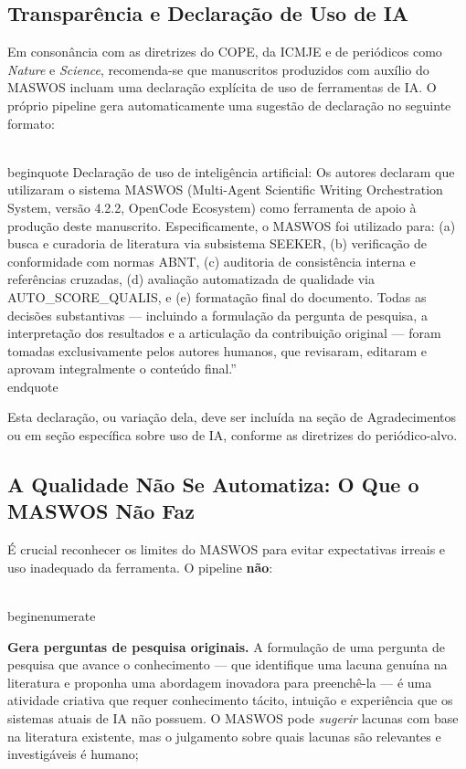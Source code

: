 \subsection{Transparência e Declaração de Uso de IA}
\label{sec:transparencia_ia}

Em consonância com as diretrizes do COPE, da ICMJE e de
periódicos como \textit{Nature} e \textit{Science},
recomenda-se que manuscritos produzidos com auxílio do MASWOS
incluam uma declaração explícita de uso de ferramentas de IA. O
próprio pipeline gera automaticamente uma sugestão de declaração
no seguinte formato:

\\begin{quote}
Declaração de uso de inteligência artificial: Os autores
declaram que utilizaram o sistema MASWOS (Multi-Agent Scientific
Writing Orchestration System, versão 4.2.2, OpenCode Ecosystem)
como ferramenta de apoio à produção deste manuscrito.
Especificamente, o MASWOS foi utilizado para: (a) busca e
curadoria de literatura via subsistema SEEKER, (b) verificação
de conformidade com normas ABNT, (c) auditoria de consistência
interna e referências cruzadas, (d) avaliação automatizada de
qualidade via AUTO\_SCORE\_QUALIS, e (e) formatação final
do documento. Todas as decisões substantivas — incluindo a
formulação da pergunta de pesquisa, a interpretação dos
resultados e a articulação da contribuição original — foram
tomadas exclusivamente pelos autores humanos, que revisaram,
editaram e aprovam integralmente o conteúdo final.''
\\end{quote}

Esta declaração, ou variação dela, deve ser incluída na seção de
Agradecimentos ou em seção específica sobre uso de IA, conforme
as diretrizes do periódico-alvo.

\subsection{A Qualidade Não Se Automatiza: O Que o MASWOS Não Faz}
\label{sec:o_que_nao_faz}

É crucial reconhecer os limites do MASWOS para evitar expectativas
irreais e uso inadequado da ferramenta. O pipeline \textbf{não}:

\\begin{enumerate}
    \item \textbf{Gera perguntas de pesquisa originais.} A
    formulação de uma pergunta de pesquisa que avance o
    conhecimento — que identifique uma lacuna genuína na
    literatura e proponha uma abordagem inovadora para
    preenchê-la — é uma atividade criativa que requer
    conhecimento tácito, intuição e experiência que os sistemas
    atuais de IA não possuem. O MASWOS pode \textit{sugerir}
    lacunas com base na literatura existente, mas o julgamento
    sobre quais lacunas são relevantes e investigáveis é humano;

